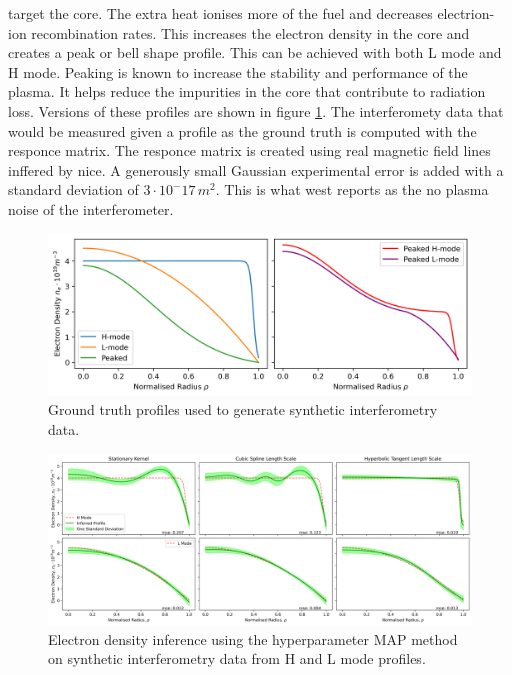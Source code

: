target the core. The extra heat ionises more of the fuel and decreases electrion-ion recombination rates. This increases the electron density in the core and creates a peak or bell shape profile. This can be achieved with both L mode and H mode. Peaking is known to increase the stability and performance of the plasma. It helps reduce the impurities in the core that contribute to radiation loss. Versions of these profiles are shown in figure \ref{fig:groundtruth}. The interferomety data that would be measured given a profile as the ground truth is computed with the responce matrix. The responce matrix is created using real magnetic field lines inffered by \gls{nice}. A generously small Gaussian experimental error is added with a standard deviation of $3\cdot10^-17 \, m^2$. This is what \gls{west} reports as the no plasma noise of the interferometer. 


\begin{figure}[ht]
    \centering
    \includegraphics[width=\textwidth]{images/syntheticProfiles.png}
    \caption{Ground truth profiles used to generate synthetic interferometry data.}
    \label{fig:groundtruth}
\end{figure}

\begin{figure}[ht]
    \centering
    \includegraphics[width=500pt, angle=90]{images/Final/MAPsynthetic_final_hl.png}
    \caption{Electron density inference using the hyperparameter MAP method on synthetic interferometry data from H and L mode profiles.}
    \label{fig:mapsynthetic_hl}
\end{figure}

